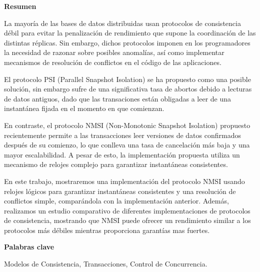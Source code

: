 \newpage

\begin{center}
{\bf \Huge Resumen}
\end{center}

\vspace{1cm}

La mayoría de las bases de datos distribuidas usan protocolos de consistencia débil
para evitar la penalización de rendimiento que supone la coordinación de las distintas
réplicas. Sin embargo, dichos protocolos imponen en los programadores la necesidad de
razonar sobre posibles anomalías, así como implementar mecanismos de resolución de
conflictos en el código de las aplicaciones.

El protocolo PSI (Parallel Snapshot Isolation) se ha propuesto como una posible solución,
sin embargo sufre de una significativa tasa de abortos debido a lecturas de datos antiguos,
dado que las transaciones están obligadas a leer de una instantánea fijada en el momento
en que comienzan.

En contraste, el protocolo NMSI (Non-Monotonic Snapshot Isolation) propuesto recientemente
permite a las transacciones leer versiones de datos confirmados después de su comienzo,
lo que conlleva una tasa de cancelación más baja y una mayor escalabilidad. A pesar de esto,
la implementación propuesta utiliza un mecanismo de relojes complejo para garantizar instantáneas
consistentes.

En este trabajo, mostraremos una implementación del protocolo NMSI usando relojes lógicos
para garantizar instantáneas consistentes y una resolución de conflictos simple, comparándola
con la implementación anterior. Además, realizamos un estudio comparativo de diferentes
implementaciones de protocolos de consistencia, mostrando que NMSI puede ofrecer un rendimiento
similar a los protocolos más débiles mientras proporciona garantías mas fuertes.

\vspace{1cm}

\begin{center}
{\bf \Large Palabras clave}
\end{center}

\vspace{0.5cm}

Modelos de Consistencia, Transacciones, Control de Concurrencia.
